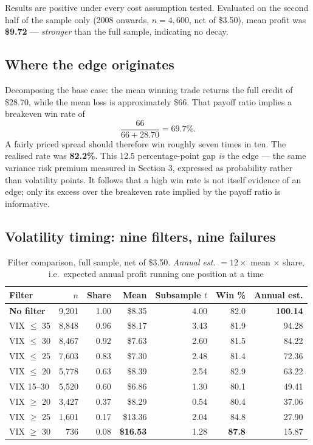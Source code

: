 \documentclass[11pt,a4paper]{article}
\begin{document}
Results are positive under every cost assumption tested. Evaluated on the second half of the sample
only (2008 onwards, $n=4{,}600$, net of \$3.50), mean profit was \textbf{\$9.72} --- \emph{stronger}
than the full sample, indicating no decay.

\subsection{Where the edge originates}

Decomposing the base case: the mean winning trade returns the full credit of \$28.70, while the mean
loss is approximately \$66. That payoff ratio implies a breakeven win rate of
\begin{equation}
\frac{66}{66 + 28.70} = 69.7\%.
\end{equation}
A fairly priced spread should therefore win roughly seven times in ten. The realised rate was
\textbf{82.2\%}. This 12.5 percentage-point gap \emph{is} the edge --- the same variance risk premium
measured in Section 3, expressed as probability rather than volatility points. It follows that a high
win rate is not itself evidence of an edge; only its excess over the breakeven rate implied by the
payoff ratio is informative.

\subsection{Volatility timing: nine filters, nine failures}

\begin{table}[h]
\centering
\caption{Filter comparison, full sample, net of \$3.50. \textit{Annual est.} $= 12 \times$ mean
$\times$ share, i.e.\ expected annual profit running one position at a time}
\begin{tabular}{@{}lrrrrrr@{}}
\toprule
Filter & $n$ & Share & Mean & Subsample $t$ & Win \% & Annual est. \\
\midrule
\textbf{No filter} & 9,201 & 1.00 & \$8.35 & 4.00 & 82.0 & \textbf{100.14} \\
VIX $\leq$ 35 & 8,848 & 0.96 & \$8.17 & 3.43 & 81.9 & 94.28 \\
VIX $\leq$ 30 & 8,467 & 0.92 & \$7.63 & 2.60 & 81.5 & 84.22 \\
VIX $\leq$ 25 & 7,603 & 0.83 & \$7.30 & 2.48 & 81.4 & 72.36 \\
VIX $\leq$ 20 & 5,778 & 0.63 & \$8.39 & 2.54 & 82.9 & 63.22 \\
VIX 15--30 & 5,520 & 0.60 & \$6.86 & 1.30 & 80.1 & 49.41 \\
VIX $\geq$ 20 & 3,427 & 0.37 & \$8.29 & 0.54 & 80.4 & 37.06 \\
VIX $\geq$ 25 & 1,601 & 0.17 & \$13.36 & 2.04 & 84.8 & 27.90 \\
VIX $\geq$ 30 & 736 & 0.08 & \textbf{\$16.53} & 1.28 & \textbf{87.8} & 15.87 \\
\bottomrule
\end{tabular}
\end{table}
\end{document}
